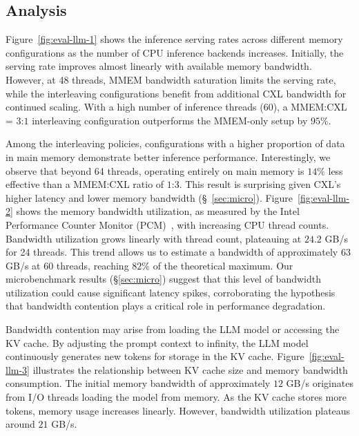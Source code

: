 \subsection{Analysis}
Figure~\ref{fig:eval-llm-1} shows the inference serving rates across different memory configurations as the number of CPU inference backends increases. Initially, the serving rate improves almost linearly with available memory bandwidth. However, at 48 threads, MMEM bandwidth saturation limits the serving rate, while the interleaving configurations benefit from additional CXL bandwidth for continued scaling. With a high number of inference threads (60), a MMEM:CXL = $3$:$1$ interleaving configuration outperforms the MMEM-only setup by $95\%$.

Among the interleaving policies, configurations with a higher proportion of data in main memory demonstrate better inference performance. Interestingly, we observe that beyond 64 threads, operating entirely on main memory is $14\%$ less effective than a MMEM:CXL ratio of $1$:$3$. This result is surprising given CXL’s higher latency and lower memory bandwidth (\S~\ref{sec:micro}). Figure~\ref{fig:eval-llm-2} shows the memory bandwidth utilization, as measured by the Intel Performance Counter Monitor (PCM)~\cite{pcm}, with increasing CPU thread counts. Bandwidth utilization grows linearly with thread count, plateauing at $24.2$ GB/s for 24 threads. This trend allows us to estimate a bandwidth of approximately $63$ GB/s at 60 threads, reaching $82\%$ of the theoretical maximum. Our microbenchmark results (\S\ref{sec:micro}) suggest that this level of bandwidth utilization could cause significant latency spikes, corroborating the hypothesis that bandwidth contention plays a critical role in performance degradation.

Bandwidth contention may arise from loading the LLM model or accessing the KV cache. By adjusting the prompt context to infinity, the LLM model continuously generates new tokens for storage in the KV cache. Figure~\ref{fig:eval-llm-3} illustrates the relationship between KV cache size and memory bandwidth consumption. The initial memory bandwidth of approximately $12$ GB/s originates from I/O threads loading the model from memory. As the KV cache stores more tokens, memory usage increases linearly. However, bandwidth utilization plateaus around $21$ GB/s.

